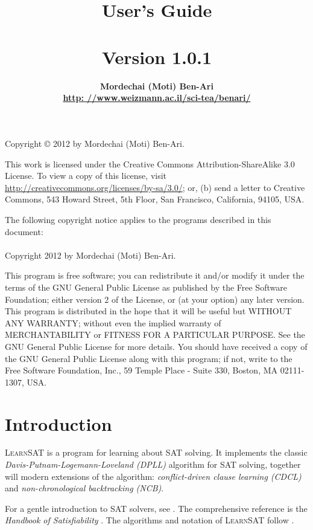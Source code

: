 \documentclass[11pt]{article}
\author{\bfseries Mordechai (Moti) Ben-Ari\\\url{http: //www.weizmann.ac.il/sci-tea/benari/}}
\title{\bfseries \ls\\\mbox{}\\
\bfseries\large User's Guide\\\mbox{}\\
\bfseries\normalsize Version 1.0.1}
\newcommand*{\ls}{\textsc{LearnSAT}}
\begin{document}
\maketitle
\thispagestyle{empty}

\vfill

\begin{center}
Copyright \copyright{} 2012 by Mordechai (Moti) Ben-Ari.
\end{center}
This work is licensed under the Creative Commons Attribution-ShareAlike 3.0
License. To view a copy of this license, visit
\url{http://creativecommons.org/licenses/by-sa/3.0/}; or, (b) send a letter
to Creative Commons, 543 Howard Street, 5th Floor, San Francisco,
California, 94105, USA.

\bigskip

 
\begin{center}
The following copyright notice applies to the programs described in this
document:\mbox{}\\\mbox{}\\
Copyright 2012 by Mordechai (Moti) Ben-Ari.
\end{center}

This program is free software; you can redistribute it and/or
modify it under the terms of the GNU General Public License
as published by the Free Software Foundation; either version 2
of the License, or (at your option) any later version.
This program is distributed in the hope that it will be useful
but WITHOUT ANY WARRANTY; without even the implied warranty of
MERCHANTABILITY or FITNESS FOR A PARTICULAR PURPOSE.
See the GNU General Public License for more details.
You should have received a copy of the GNU General Public License
along with this program; if not, write to the Free Software
Foundation, Inc., 59 Temple Place - Suite 330, Boston, MA
02111-1307, USA.

\newpage

\section{Introduction}

\ls{} is a program for learning about SAT solving. It implements the
classic \emph{Davis-Putnam-Logemann-Loveland (DPLL)} algorithm for SAT
solving, together will modern extensions of the algorithm:
\emph{conflict-driven clause learning (CDCL)} and
\emph{non-chronological backtracking (NCB)}.

For a gentle introduction to SAT solvers, see \cite[Chapter~6]{mlcs}.
The comprehensive reference is the \emph{Handbook of Satisfiability}
\cite{SAT}. The algorithms and notation of \ls{} follow \cite{mlm}.
\end{document}
